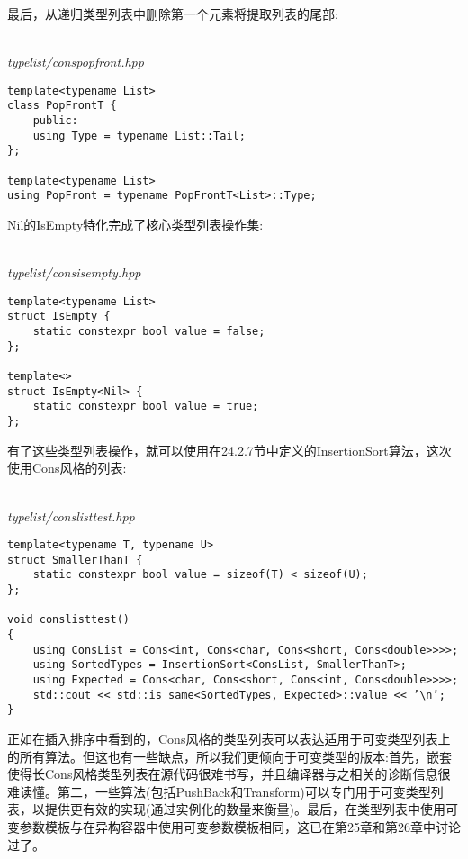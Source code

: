 最后，从递归类型列表中删除第一个元素将提取列表的尾部:

\hspace*{\fill} \\ %
\noindent
\textit{typelist/conspopfront.hpp}
\begin{lstlisting}[style=styleCXX]
template<typename List>
class PopFrontT {
	public:
	using Type = typename List::Tail;
};

template<typename List>
using PopFront = typename PopFrontT<List>::Type;
\end{lstlisting}

Nil的IsEmpty特化完成了核心类型列表操作集:

\hspace*{\fill} \\ %
\noindent
\textit{typelist/consisempty.hpp}
\begin{lstlisting}[style=styleCXX]
template<typename List>
struct IsEmpty {
	static constexpr bool value = false;
};

template<>
struct IsEmpty<Nil> {
	static constexpr bool value = true;
};
\end{lstlisting}

有了这些类型列表操作，就可以使用在24.2.7节中定义的InsertionSort算法，这次使用Cons风格的列表:

\hspace*{\fill} \\ %
\noindent
\textit{typelist/conslisttest.hpp}
\begin{lstlisting}[style=styleCXX]
template<typename T, typename U>
struct SmallerThanT {
	static constexpr bool value = sizeof(T) < sizeof(U);
};

void conslisttest()
{
	using ConsList = Cons<int, Cons<char, Cons<short, Cons<double>>>>;
	using SortedTypes = InsertionSort<ConsList, SmallerThanT>;
	using Expected = Cons<char, Cons<short, Cons<int, Cons<double>>>>;
	std::cout << std::is_same<SortedTypes, Expected>::value << ’\n’;
}
\end{lstlisting}

正如在插入排序中看到的，Cons风格的类型列表可以表达适用于可变类型列表上的所有算法。但这也有一些缺点，所以我们更倾向于可变类型的版本:首先，嵌套使得长Cons风格类型列表在源代码很难书写，并且编译器与之相关的诊断信息很难读懂。第二，一些算法(包括PushBack和Transform)可以专门用于可变类型列表，以提供更有效的实现(通过实例化的数量来衡量)。最后，在类型列表中使用可变参数模板与在异构容器中使用可变参数模板相同，这已在第25章和第26章中讨论过了。





















